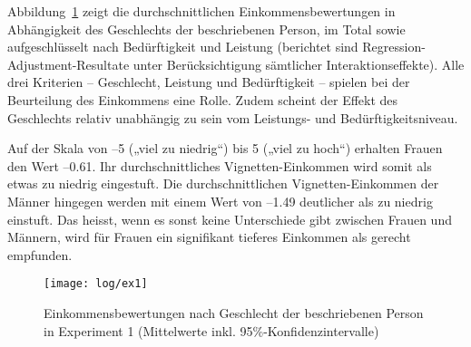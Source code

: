 \documentclass[a4paper,12pt]{article}
\begin{document}
Abbildung~\ref{fig-ex1} zeigt die durchschnittlichen Einkommensbewertungen in
Abhängigkeit des Geschlechts der beschriebenen Person, im Total sowie
aufgeschlüsselt nach Bedürftigkeit und Leistung (berichtet sind Regression-Adjustment-Resultate unter 
Berücksichtigung sämtlicher Interaktionseffekte). Alle drei Kriterien --
Geschlecht, Leistung und Bedürftigkeit -- spielen bei der Beurteilung des
Einkommens eine Rolle. Zudem scheint der Effekt des Geschlechts
relativ unabhängig zu sein vom Leistungs- und Bedürftigkeitsniveau.


Auf der Skala von --5 („viel zu niedrig“) bis 5 („viel zu hoch“) erhalten
Frauen den Wert --0.61. Ihr durchschnittliches Vignetten-Einkommen wird somit
als etwas zu niedrig eingestuft. Die durchschnittlichen Vignetten-Einkommen der
Männer hingegen werden mit einem Wert von --1.49 deutlicher als zu niedrig
einstuft. Das heisst, wenn es sonst keine Unterschiede gibt zwischen Frauen und
Männern, wird für Frauen ein signifikant tieferes Einkommen als gerecht
empfunden.

\begin{figure}\centering
    \texttt{[image: log/ex1]}
    \caption{Einkommensbewertungen nach Geschlecht der beschriebenen Person 
    in Experiment 1 (Mittelwerte inkl. 95\%-Konfidenzintervalle)}\label{fig-ex1}
\end{figure}

\end{document}
